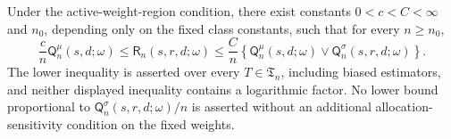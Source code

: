 Under the active-weight-region condition, there exist constants \(0<c<C<\infty\) and \(n_0\), depending only on the fixed class constants, such that for every \(n\ge n_0\),
\[
\frac{c}{n}\mathsf Q_n^{\mu}(s,d;\omega)
\leq \mathsf R_n(s,r,d;\omega)
\leq \frac{C}{n}\left\{\mathsf Q_n^{\mu}(s,d;\omega)\vee
\mathsf Q_n^{\sigma}(s,r,d;\omega)\right\}.
\]
The lower inequality is asserted over every \(T\in\mathfrak T_n\), including biased estimators, and neither displayed inequality contains a logarithmic factor.  No lower bound proportional to \(\mathsf Q_n^{\sigma}(s,r,d;\omega)/n\) is asserted without an additional allocation-sensitivity condition on the fixed weights.